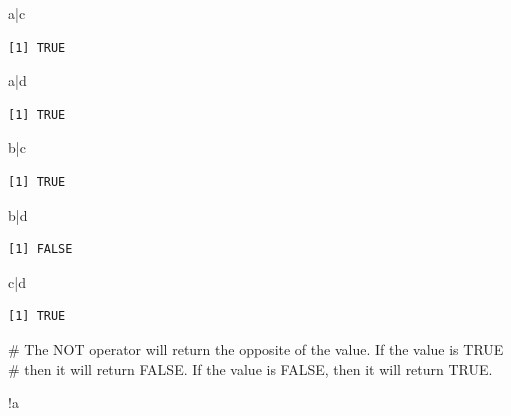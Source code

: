 \documentclass[
  letterpaper,
  DIV=11,
  numbers=noendperiod]{scrreprt}
\newenvironment{Shaded}{\begin{snugshade}}{\end{snugshade}}
\newcommand{\CommentTok}[1]{\textcolor[rgb]{0.37,0.37,0.37}{#1}}
\newcommand{\NormalTok}[1]{\textcolor[rgb]{0.00,0.23,0.31}{#1}}
\newcommand{\SpecialCharTok}[1]{\textcolor[rgb]{0.37,0.37,0.37}{#1}}
\begin{document}
\begin{Shaded}
\begin{Highlighting}[]
\NormalTok{a}\SpecialCharTok{|}\NormalTok{c}
\end{Highlighting}
\end{Shaded}

\begin{verbatim}
[1] TRUE
\end{verbatim}

\begin{Shaded}
\begin{Highlighting}[]
\NormalTok{a}\SpecialCharTok{|}\NormalTok{d}
\end{Highlighting}
\end{Shaded}

\begin{verbatim}
[1] TRUE
\end{verbatim}

\begin{Shaded}
\begin{Highlighting}[]
\NormalTok{b}\SpecialCharTok{|}\NormalTok{c}
\end{Highlighting}
\end{Shaded}

\begin{verbatim}
[1] TRUE
\end{verbatim}

\begin{Shaded}
\begin{Highlighting}[]
\NormalTok{b}\SpecialCharTok{|}\NormalTok{d}
\end{Highlighting}
\end{Shaded}

\begin{verbatim}
[1] FALSE
\end{verbatim}

\begin{Shaded}
\begin{Highlighting}[]
\NormalTok{c}\SpecialCharTok{|}\NormalTok{d}
\end{Highlighting}
\end{Shaded}

\begin{verbatim}
[1] TRUE
\end{verbatim}

\begin{Shaded}
\begin{Highlighting}[]
\CommentTok{\# The NOT operator will return the opposite of the value. If the value is TRUE}
\CommentTok{\# then it will return FALSE. If the value is FALSE, then it will return TRUE.}

\SpecialCharTok{!}\NormalTok{a}
\end{Highlighting}
\end{Shaded}
\end{document}
